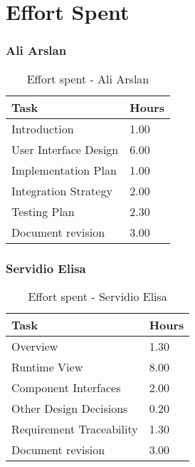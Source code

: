 \chapter{Effort Spent}

\subsection{Ali Arslan}
\renewcommand{\arraystretch}{2}
\begin{longtable}{|m{9cm}|m{1.2cm}|}
\caption{Effort spent - Ali Arslan}\\
\hline
\endfirsthead
\endhead
\hline
\endlastfoot
\rowcolor{green2}
\textbf{Task} & \hfil {\textbf{Hours}}\\
\hline
Introduction & \hfil 1.00 \\
User Interface Design & \hfil 6.00 \\
Implementation Plan & \hfil 1.00 \\
Integration Strategy & \hfil 2.00 \\
Testing Plan & \hfil 2.30 \\
Document revision & \hfil 3.00\\
\hline
\end{longtable}

\newpage
\subsection{Servidio Elisa}
\renewcommand{\arraystretch}{2}
\begin{longtable}{|m{9cm}|m{1.2cm}|}
\caption{Effort spent - Servidio Elisa}\\
\hline
\endfirsthead
\endhead
\hline
\endlastfoot
\rowcolor{green2}
\textbf{Task} &\hfil {\textbf{Hours}}\\
\hline
Overview & \hfil 1.30 \\
Runtime View & \hfil 8.00 \\
Component Interfaces & \hfil 2.00\\
Other Design Decisions & \hfil 0.20\\
Requirement Traceability  & \hfil 1.30\\
Document revision & \hfil 3.00\\
\hline
\end{longtable}

